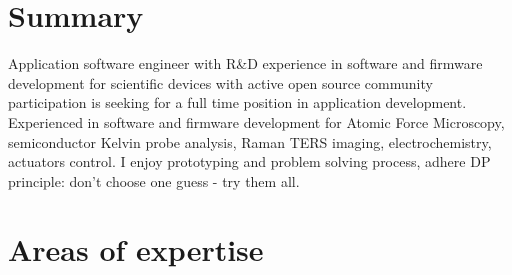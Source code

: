 \documentclass{sb_cv}
\begin{document}
\makecvtitle
\vspace*{-15mm}

\section{Summary}

Application software engineer with R\&D experience in software and firmware development for scientific devices with active open source community participation is seeking for a full time position in application development. Experienced in software and firmware development for Atomic Force Microscopy, semiconductor Kelvin probe analysis, Raman TERS imaging, electrochemistry, actuators control. I enjoy prototyping and problem solving process, adhere DP principle: don't choose one guess - try them all.

\vspace*{-3mm}
\section{Areas of expertise}

\vspace*{-3mm}
\end{document}
